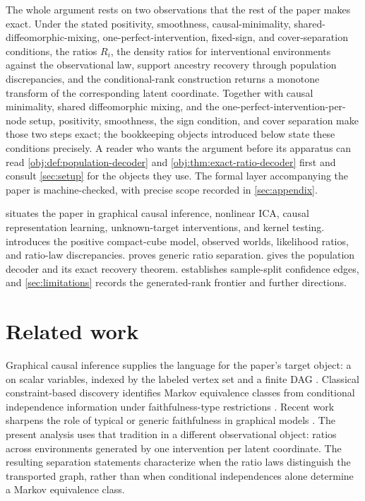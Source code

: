\documentclass[11pt]{article}
\begin{document}
The whole argument rests on two observations that the rest of the paper makes exact. Under the stated positivity, smoothness, causal-minimality, shared-diffeomorphic-mixing, one-perfect-intervention, fixed-sign, and cover-separation conditions, the ratios \(R_i\), the density ratios for interventional environments against the observational law, support ancestry recovery through population discrepancies, and the conditional-rank construction returns a monotone transform of the corresponding latent coordinate. Together with causal minimality, shared diffeomorphic mixing, and the one-perfect-intervention-per-node setup, positivity, smoothness, the sign condition, and cover separation make those two steps exact; the bookkeeping objects introduced below state these conditions precisely. A reader who wants the argument before its apparatus can read \cref{obj:def:population-decoder} and \cref{obj:thm:exact-ratio-decoder} first and consult \cref{sec:setup} for the objects they use. The formal layer accompanying the paper is machine-checked, with precise scope recorded in \cref{sec:appendix}.

 situates the paper in graphical causal inference, nonlinear ICA, causal representation learning, unknown-target interventions, and kernel testing.  introduces the positive compact-cube model, observed worlds, likelihood ratios, and ratio-law discrepancies.  proves generic ratio separation.  gives the population decoder and its exact recovery theorem.  establishes sample-split confidence edges, and \cref{sec:limitations} records the generated-rank frontier and further directions.


\section{Related work}\label{sec:related-work}

Graphical causal inference supplies the language for the paper's target object: a  on  scalar variables, indexed by the labeled vertex set  and a finite DAG . Classical constraint-based discovery identifies Markov equivalence classes from conditional independence information under faithfulness-type restrictions \citep{Meek1995}. Recent work sharpens the role of typical or generic faithfulness in graphical models \citep{BoekenForreMooij2024TypicalFaithfulness}. The present analysis uses that tradition in a different observational object: ratios across environments generated by one intervention per latent coordinate. The resulting separation statements characterize when the ratio laws distinguish the transported graph, rather than when conditional independences alone determine a Markov equivalence class.
\end{document}
